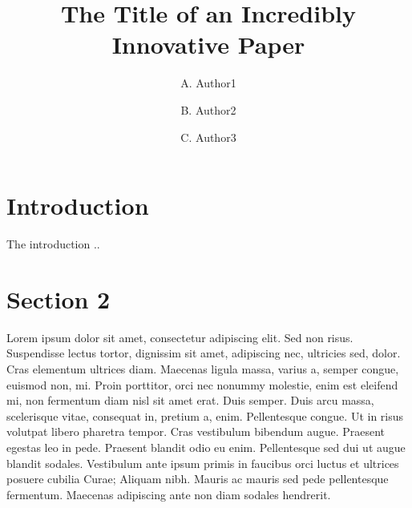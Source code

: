 \documentclass[11pt]{article}
\begin{document}
\title{The Title of an Incredibly Innovative Paper} 

\author[1]{A. Author1} \author[1]{B. Author2} \author[2]{C. Author3} 



\date{}
\maketitle



\maketitle


\section{Introduction}
The introduction ..


\section{Section 2}
Lorem ipsum dolor sit amet, consectetur adipiscing elit. Sed non risus.
Suspendisse lectus tortor, dignissim sit amet, adipiscing nec, ultricies
sed, dolor. Cras elementum ultrices diam. Maecenas ligula massa, varius
a, semper congue, euismod non, mi. Proin porttitor, orci nec nonummy
molestie, enim est eleifend mi, non fermentum diam nisl sit amet erat.
Duis semper. Duis arcu massa, scelerisque vitae, consequat in, pretium
a, enim. Pellentesque congue. Ut in risus volutpat libero pharetra
tempor. Cras vestibulum bibendum augue. Praesent egestas leo in pede.
Praesent blandit odio eu enim. Pellentesque sed dui ut augue blandit
sodales. Vestibulum ante ipsum primis in faucibus orci luctus et
ultrices posuere cubilia Curae; Aliquam nibh. Mauris ac mauris sed pede
pellentesque fermentum. Maecenas adipiscing ante non diam sodales
hendrerit.
\end{document}
